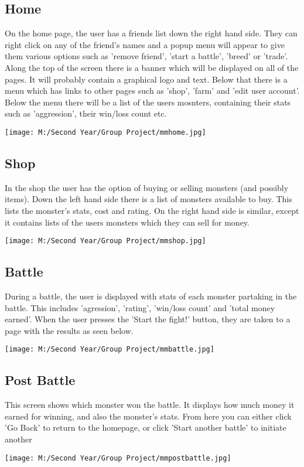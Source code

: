 \documentclass[titlepage]{article}
\begin{document}
\subsection{Home}
On the home page, the user has a friends list down the right hand side. They can right click on any of the friend's names and a popup menu will appear to give them various options such as 'remove friend', 'start a battle', 'breed' or 'trade'. Along the top of the screen there is a banner which will be displayed on all of the pages. It will probably contain a graphical logo and text. Below that there is a menu which has links to other pages such as 'shop', 'farm' and 'edit user account'. Below the menu there will be a list of the users mosnters, containing their stats such as 'aggression', their win/loss count etc.
\begin{figure*}[h]
\centering
\texttt{[image: M:/Second Year/Group Project/mmhome.jpg]}
\label{fig:mmhome}
\end{figure*}
\newpage
\subsection{Shop}
In the shop the user has the option of buying or selling monsters (and possibly items). Down the left hand side there is a list of monsters available to buy. This lists the monster's stats, cost and rating. On the right hand side is similar, except it contains lists of the users monsters which they can sell for money.
\begin{figure*}[h]
\centering
\texttt{[image: M:/Second Year/Group Project/mmshop.jpg]}
\label{fig:mmshop}
\end{figure*}
\newpage
\subsection{Battle}
During a battle, the user is displayed with stats of each monster partaking in the battle. This includes 'agression', 'rating', 'win/loss count' and 'total money earned'. When the user presses the 'Start the fight!' button, they are taken to a page with the results as seen below.
\begin{figure*}[h]
\centering
\texttt{[image: M:/Second Year/Group Project/mmbattle.jpg]}
\label{fig:mmbattle}
\end{figure*}
\newpage
\subsection{Post Battle}
This screen shows which monster won the battle. It displays how much money it earned for winning, and also the monster's stats. From here you can either click 'Go Back' to return to the homepage, or click 'Start another battle' to initiate another
\begin{figure*}[h]
\centering
\texttt{[image: M:/Second Year/Group Project/mmpostbattle.jpg]}
\label{fig:mmpostbattle}
\end{figure*}
\newpage
\end{document}
